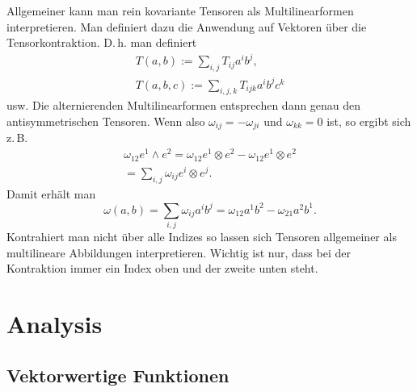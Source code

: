 \documentclass[a4paper,10pt,fleqn,twocolumn,twoside]{article}
\numberwithin{equation}{section}
\begin{document}
Allgemeiner kann man rein kovariante Tensoren als Multilinearformen
interpretieren. Man definiert dazu die Anwendung auf Vektoren über die
Tensorkontraktion. D.\,h. man definiert
\begin{gather*}
T(a,b) := \sum_{i,j} T_{ij}a^ib^j,\\
T(a,b,c) := \sum_{i,j,k} T_{ijk}a^ib^jc^k
\end{gather*}
usw. Die alternierenden Multilinearformen entsprechen dann genau
den antisymmetrischen Tensoren. Wenn also $\omega_{ij}=-\omega_{ji}$
und $\omega_{kk}=0$ ist, so ergibt sich z.\,B.
\begin{gather*}
\omega_{12}e^1\wedge e^2
= \omega_{12}e^1\otimes e^2-\omega_{12}e^1\otimes e^2\\
= \sum_{i,j}\omega_{ij}e^i\otimes e^j.
\end{gather*}
Damit erhält man
\begin{equation}
\omega(a,b) = \sum_{i,j}\omega_{ij}a^ib^j
= \omega_{12}a^1b^2-\omega_{21}a^2b^1.
\end{equation}
Kontrahiert man nicht über alle Indizes so lassen sich Tensoren
allgemeiner als multilineare Abbildungen interpretieren. Wichtig ist
nur, dass bei der Kontraktion immer ein Index oben und der zweite
unten steht.

\section{Analysis}
\subsection{Vektorwertige Funktionen}
\end{document}
